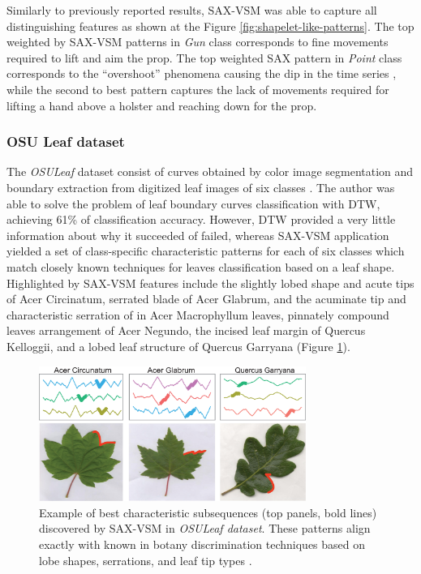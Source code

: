 \documentclass[conference]{IEEEtran}
\begin{document}
Similarly to previously reported results, SAX-VSM was able to capture all 
distinguishing features as shown at the Figure \ref{fig:shapelet-like-patterns}. 
The top weighted by SAX-VSM patterns in \textit{Gun} class corresponds 
to fine movements required to lift and aim the prop. 
The top weighted SAX pattern in \textit{Point} class corresponds to the 
``overshoot'' phenomena causing the dip in the time series \cite{gun}, 
while the second to best pattern captures the lack of movements
required for lifting a hand above a holster and reaching down for the prop. 

\subsubsection{OSU Leaf dataset}
The \textit{OSULeaf} dataset consist of curves obtained by color image segmentation 
and boundary extraction from digitized leaf images of six classes \cite{osuleaf}.
The author was able to solve the problem of leaf boundary curves classification 
with DTW, achieving 61\% of classification accuracy. 
However, DTW provided a very little information about why it succeeded of failed,
whereas SAX-VSM application yielded a set of class-specific characteristic 
patterns for each of six classes which match closely known techniques 
for leaves classification based on a leaf shape\cite{dirr}. 
Highlighted by SAX-VSM features include the slightly lobed shape and acute tips of
Acer Circinatum, serrated blade of Acer Glabrum, and the acuminate tip and characteristic
serration of in Acer Macrophyllum leaves, pinnately compound leaves arrangement of Acer Negundo, the
incised leaf margin of Quercus Kelloggii, and a lobed leaf structure of Quercus Garryana 
(Figure \ref{fig:shapelet-acer-patterns}).

\begin{figure}[t]
   \centering
   \vspace{-0.2cm}
   \includegraphics[width=87mm]{figures/AcerCircunatum-short.eps}
   \caption{Example of best characteristic subsequences (top panels, bold lines) discovered 
   by SAX-VSM in \textit{OSULeaf dataset}.
    These patterns align exactly with known in botany discrimination techniques based on lobe shapes, 
    serrations, and leaf tip types \cite{dirr}.}
   \label{fig:shapelet-acer-patterns}
   \vspace{-0.2cm}
\end{figure}
\end{document}
